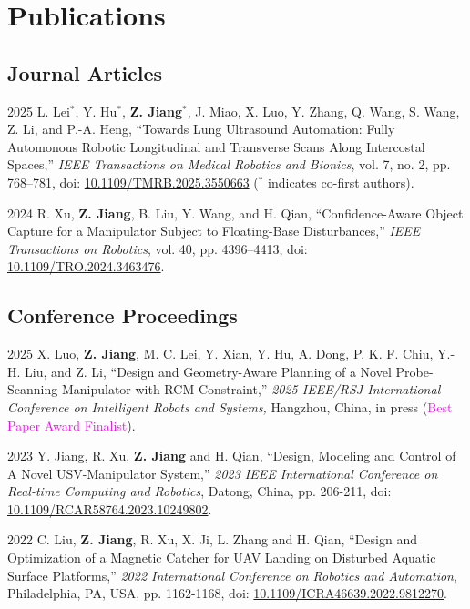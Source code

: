 \documentclass[11pt,letterpaper]{report}
\begin{document}
\section*{Publications}
\subsection*{Journal Articles}
\begin{tablist}
	\item[2025]	 \tab{}L. Lei$^*$, Y. Hu$^*$, \textbf{Z. Jiang}$^*$, J. Miao, X. Luo, Y. Zhang, Q. Wang, S. Wang, Z. Li, and P.-A. Heng, ``Towards Lung Ultrasound Automation: Fully Automonous Robotic Longitudinal and Transverse Scans Along Intercostal Spaces,'' \textit{IEEE Transactions on Medical Robotics and Bionics}, vol. 7, no. 2, pp. 768--781, doi: \href{https://doi.org/10.1109/TMRB.2025.3550663}{10.1109/TMRB.2025.3550663} ($^*$ indicates co-first authors).
	
	\item[2024]  \tab{}R. Xu, \textbf{Z. Jiang}, B. Liu, Y. Wang, and H. Qian, ``Confidence-Aware Object Capture for a Manipulator Subject to Floating-Base Disturbances,'' \textit{IEEE Transactions on Robotics}, vol. 40, pp. 4396--4413, doi: \href{https://doi.org/10.1109/TRO.2024.3463476}{10.1109/TRO.2024.3463476}.
\end{tablist}
	
\subsection*{Conference Proceedings}
\begin{tablist}
	\item[2025] \tab X. Luo, \textbf{Z. Jiang}, M. C. Lei, Y. Xian, Y. Hu, A. Dong, P. K. F. Chiu, Y.-H. Liu, and Z. Li, ``Design and Geometry-Aware Planning of a Novel Probe-Scanning Manipulator with RCM Constraint,'' \textit{2025 IEEE/RSJ International Conference on Intelligent Robots and Systems,} Hangzhou, China, in press (\textcolor{magenta}{Best Paper Award Finalist}).
	
	\item[2023]   \tab{}Y. Jiang, R. Xu, \textbf{Z. Jiang} and H. Qian, ``Design, Modeling and Control of A Novel USV-Manipulator System,'' \textit{2023 IEEE International Conference on Real-time Computing and Robotics}, Datong, China, pp. 206-211, doi: \href{https://doi.org/10.1109/RCAR58764.2023.10249802}{ 10.1109/RCAR58764.2023.10249802}.
		
	\item[2022]   \tab{}C. Liu, \textbf{Z. Jiang}, R. Xu, X. Ji, L. Zhang and H. Qian, ``Design and Optimization of a Magnetic Catcher for UAV Landing on Disturbed Aquatic Surface Platforms,'' \textit{2022 International Conference on Robotics and Automation}, Philadelphia, PA, USA, pp. 1162-1168, doi: \href{https://doi.org/10.1109/ICRA46639.2022.9812270}{ 10.1109/ICRA46639.2022.9812270}.
\end{tablist}
\end{document}
